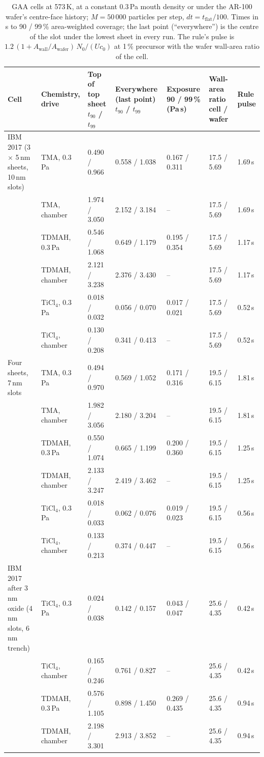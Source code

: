 \documentclass[11pt,letterpaper]{article}
\newcommand{\Awall}{A_{\mathrm{wall}}/A_{\mathrm{wafer}}}
\begin{document}
\begin{table}[tbp]
\centering
\caption{GAA cells at 573\,K, at a constant 0.3\,Pa mouth density or under the AR-100 wafer's centre-face history; $M = 50\,000$ particles per step, $dt = t_{\mathrm{flat}}/100$. Times in s to 90 / 99\,\% area-weighted coverage; the last point (``everywhere'') is the centre of the slot under the lowest sheet in every run. The rule's pulse is $1.2\,(1 + \Awall)\,N_0/(U c_0)$ at 1\,\% precursor with the wafer wall-area ratio of the cell.}
\label{tab:gaa}
\footnotesize
\setlength{\tabcolsep}{3pt}
\begin{tabular}{P{1.1in}P{0.8in}P{0.8in}P{0.85in}P{0.75in}P{0.65in}P{0.5in}}
\toprule
Cell & Chemistry, drive & Top of top sheet $t_{90}$ / $t_{99}$ & Everywhere (last point) $t_{90}$ / $t_{99}$ & Exposure 90 / 99\,\% (Pa\,s) & Wall-area ratio cell / wafer & Rule pulse \\
\midrule
IBM 2017 (3 $\times$ 5\,nm sheets, 10\,nm slots) & TMA, 0.3\,Pa & 0.490 / 0.966 & 0.558 / 1.038 & 0.167 / 0.311 & 17.5 / 5.69 & 1.69\,s \\
 & TMA, chamber & 1.974 / 3.050 & 2.152 / 3.184 & -- & 17.5 / 5.69 & 1.69\,s \\
 & TDMAH, 0.3\,Pa & 0.546 / 1.068 & 0.649 / 1.179 & 0.195 / 0.354 & 17.5 / 5.69 & 1.17\,s \\
 & TDMAH, chamber & 2.121 / 3.238 & 2.376 / 3.430 & -- & 17.5 / 5.69 & 1.17\,s \\
 & TiCl$_4$, 0.3\,Pa & 0.018 / 0.032 & 0.056 / 0.070 & 0.017 / 0.021 & 17.5 / 5.69 & 0.52\,s \\
 & TiCl$_4$, chamber & 0.130 / 0.208 & 0.341 / 0.413 & -- & 17.5 / 5.69 & 0.52\,s \\
\addlinespace
Four sheets, 7\,nm slots & TMA, 0.3\,Pa & 0.494 / 0.970 & 0.569 / 1.052 & 0.171 / 0.316 & 19.5 / 6.15 & 1.81\,s \\
 & TMA, chamber & 1.982 / 3.056 & 2.180 / 3.204 & -- & 19.5 / 6.15 & 1.81\,s \\
 & TDMAH, 0.3\,Pa & 0.550 / 1.074 & 0.665 / 1.199 & 0.200 / 0.360 & 19.5 / 6.15 & 1.25\,s \\
 & TDMAH, chamber & 2.133 / 3.247 & 2.419 / 3.462 & -- & 19.5 / 6.15 & 1.25\,s \\
 & TiCl$_4$, 0.3\,Pa & 0.018 / 0.033 & 0.062 / 0.076 & 0.019 / 0.023 & 19.5 / 6.15 & 0.56\,s \\
 & TiCl$_4$, chamber & 0.133 / 0.213 & 0.374 / 0.447 & -- & 19.5 / 6.15 & 0.56\,s \\
\addlinespace
IBM 2017 after 3\,nm oxide (4\,nm slots, 6\,nm trench) & TiCl$_4$, 0.3\,Pa & 0.024 / 0.038 & 0.142 / 0.157 & 0.043 / 0.047 & 25.6 / 4.35 & 0.42\,s \\
 & TiCl$_4$, chamber & 0.165 / 0.246 & 0.761 / 0.827 & -- & 25.6 / 4.35 & 0.42\,s \\
 & TDMAH, 0.3\,Pa & 0.576 / 1.105 & 0.898 / 1.450 & 0.269 / 0.435 & 25.6 / 4.35 & 0.94\,s \\
 & TDMAH, chamber & 2.198 / 3.301 & 2.913 / 3.852 & -- & 25.6 / 4.35 & 0.94\,s \\
\bottomrule
\end{tabular}
\end{table}
\end{document}
